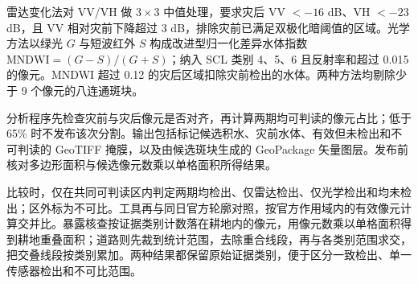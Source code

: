 雷达变化法对 VV/VH 做 $3\times3$ 中值处理，要求灾后 VV $<-16$ dB、VH $<-23$ dB，且 VV 相对灾前下降超过 3 dB，排除灾前已满足双极化暗阈值的区域。光学方法以绿光 $G$ 与短波红外 $S$ 构成改进型归一化差异水体指数 $\mathrm{MNDWI}=(G-S)/(G+S)$\cite{mndwi}；纳入 SCL 类别 4、5、6 且反射率和超过 0.015 的像元。MNDWI 超过 0.12 的灾后区域扣除灾前检出的水体。两种方法均剔除少于 9 个像元的八连通斑块。

分析程序先检查灾前与灾后像元是否对齐，再计算两期均可判读的像元占比；低于 65\% 时不发布该次分割。输出包括标记候选积水、灾前水体、有效但未检出和不可判读的 GeoTIFF 掩膜，以及由候选斑块生成的 GeoPackage 矢量图层。发布前核对多边形面积与候选像元数乘以单格面积所得结果。

比较时，仅在共同可判读区内判定两期均检出、仅雷达检出、仅光学检出和均未检出；区外标为不可比。工具再与同日官方轮廓对照，按官方作用域内的有效像元计算交并比。暴露核查按证据类别计数落在耕地内的像元，用像元数乘以单格面积得到耕地重叠面积；道路则先裁到统计范围，去除重合线段，再与各类别范围求交，把交叠线段按类别累加。两种结果都保留原始证据类别，便于区分一致检出、单一传感器检出和不可比范围。
